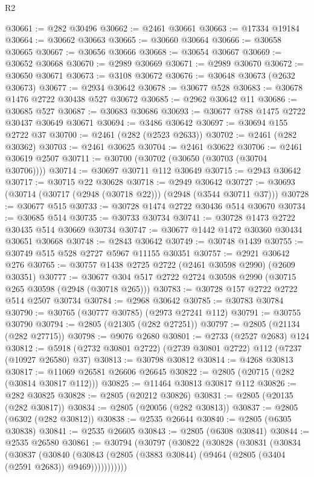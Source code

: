 \begin{lexlean}{R2}
\begin{coremodule}
@30661 := @282 @30496
@30662 := @2461 @30661
@30663 := @17334 @19184
@30664 := @30662 @30663
@30665 := @30660 @30664
@30666 := @30658 @30665
@30667 := @30656 @30666
@30668 := @30654 @30667
@30669 := @30652 @30668
@30670 := @2989 @30669
@30671 := @2989 @30670
@30672 := @30650 @30671
@30673 := @3108 @30672
@30676 := @30648 @30673 (@2632 @30673)
@30677 := @2934 @30642
@30678 := @30677 @528
@30683 := @30678 @1476 @2722 @30438 @527 @30672
@30685 := @2962 @30642 @11
@30686 := @30685 @527
@30687 := @30683 @30686
@30693 := @30677 @788 @1475 @2722 @30437 @30649 @30671
@30694 := @3486 @30642
@30697 := @30694 @155 @2722 @37
@30700 := @2461 (@282 (@2523 @2633))
@30702 := @2461 (@282 @30362)
@30703 := @2461 @30625
@30704 := @2461 @30622
@30706 := @2461 @30619 @2507
@30711 := @30700 (@30702 (@30650 (@30703 (@30704 @30706))))
@30714 := @30697 @30711 @112 @30649
@30715 := @2943 @30642
@30717 := @30715 @22 @30628
@30718 := @2949 @30642
@30727 := @30693 (@30714 (@30717 (@2948 (@30718 @22))) (@2948 (@3544 @30711 @37)))
@30728 := @30677 @515
@30733 := @30728 @1474 @2722 @30436 @514 @30670
@30734 := @30685 @514
@30735 := @30733 @30734
@30741 := @30728 @1473 @2722 @30435 @514 @30669 @30734
@30747 := @30677 @1442 @1472 @30360 @30434 @30651 @30668
@30748 := @2843 @30642
@30749 := @30748 @1439
@30755 := @30749 @515 @528 @2727 @5967 @11155 @30351
@30757 := @2921 @30642 @276
@30765 := @30757 @1438 @2725 @2722 (@2461 @30598 @2990) (@2609 @30351)
@30777 := @30677 @304 @517 @2722 @2724 @30598 @2990 (@30715 @265 @30598 (@2948 (@30718 @265)))
@30783 := @30728 @157 @2722 @2722 @514 @2507 @30734
@30784 := @2968 @30642
@30785 := @30783 @30784
@30790 := @30765 (@30777 @30785) (@2973 @27241 @112)
@30791 := @30755 @30790
@30794 := @2805 (@21305 (@282 @27251))
@30797 := @2805 (@21134 (@282 @27715))
@30798 := @9076 @2680
@30801 := @2733 (@2527 @2683) @124
@30812 := @5918 (@2732 @30801 @2722) (@2739 @30801 @2722) @112 (@7237 (@10927 @26580) @37)
@30813 := @30798 @30812
@30814 := @4268 @30813
@30817 := @11069 @26581 @26606 @26645
@30822 := @2805 (@20715 (@282 (@30814 @30817 @112)))
@30825 := @11464 @30813 @30817 @112
@30826 := @282 @30825
@30828 := @2805 (@20212 @30826)
@30831 := @2805 (@20135 (@282 @30817))
@30834 := @2805 (@20056 (@282 @30813))
@30837 := @2805 (@6302 (@282 @30812))
@30838 := @2535 @26644
@30840 := @2805 (@6305 @30838)
@30841 := @2535 @26605
@30843 := @2805 (@6308 @30841)
@30844 := @2535 @26580
@30861 := @30794
    (@30797
      (@30822
        (@30828
          (@30831
            (@30834
              (@30837
                (@30840
                  (@30843 (@2805 (@3883 @30844) (@9464 (@2805 (@3404 (@2591 @2683)) @9469)))))))))))

\end{coremodule}
\end{lexlean}
